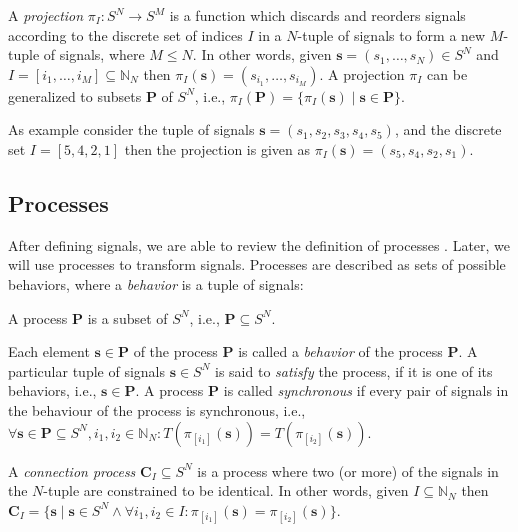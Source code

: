 \begin{definition}\label{tsm-projection}
A \emph{projection} $\pi{}_I: S^N \to S^M$ is a function which discards and reorders signals according
to the discrete set of indices $I$ in a $N$-tuple of signals
to form a new $M$-tuple of signals, where $M \le N$. In other words, given $\mathbf{s} = (s_1,\ldots,s_N) \in S^N$
and $I = [i_1,\ldots,i_M] \subseteq \mathbb{N}_N$
then $\pi{}_I(\mathbf{s}) = (s_{i_1}, \ldots, s_{i_M})$.
A projection $\pi{}_I$ can be generalized to subsets $\mathbf{P}$ of $S^N$,
i.e., $\pi{}_I(\mathbf{P}) = \{\pi{}_I(\mathbf{s}) \mid \mathbf{s} \in \mathbf{P}\}$.
\end{definition}

As example consider the tuple of signals $\mathbf{s} = (s_1,s_2,s_3,s_4,s_5)$, and the discrete set
$I=[5,4,2,1]$ then the projection is given as $\pi{}_I(\mathbf{s}) = (s_5,s_4,s_2,s_1)$.

\subsection{Processes}

After defining signals, we are able to review the definition of processes \cite{Lee98}.
Later, we will use processes to transform signals.
Processes are described as sets of possible behaviors, where
a \emph{behavior} is a tuple of signals:
\begin{definition}\label{tsm-process}
A process $\mathbf{P}$ is a subset of $S^N$, i.e., $\mathbf{P} \subseteq S^N$.
\end{definition}
Each element $\mathbf{s} \in \mathbf{P}$ of the process $\mathbf{P}$ is
called a \emph{behavior} of the process $\mathbf{P}$. A particular tuple
of signals $\mathbf{s} \in S^N$ is said to \emph{satisfy} the process,
if it is one of its behaviors, i.e., $\mathbf{s} \in \mathbf{P}$.
A process $\mathbf{P}$ is called \emph{synchronous} if
every pair of signals in the behaviour of the process is synchronous, i.e.,
$\forall{\mathbf{s} \in \mathbf{P} \subseteq S^N, i_1, i_2 \in \mathbb{N}_N}:
T(\pi{}_{[i_1]}(\mathbf{s})) = T(\pi{}_{[i_2]}(\mathbf{s}))$.

\begin{definition}\label{tsm-connection}
A \emph{connection process} $\mathbf{C}_I \subseteq S^N$ is a
process where two (or more) of the signals in the $N$-tuple are
constrained to be identical. In other words, given $I \subseteq \mathbb{N}_N$
then $\mathbf{C}_I = \{\mathbf{s} \mid \mathbf{s} \in S^N \wedge \forall{i_1, i_2 \in I}: \pi{}_{[i_1]}(\mathbf{s}) = \pi{}_{[i_2]}(\mathbf{s})\}$.
\end{definition}

